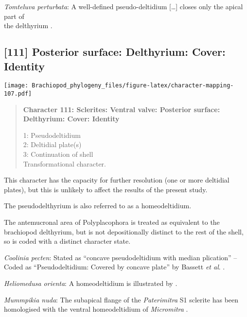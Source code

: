 \documentclass[openany]{book}
\theoremstyle{definition}
\theoremstyle{definition}
\theoremstyle{definition}
\theoremstyle{remark}
\begin{document}
\hypertarget{Tomteluva_perturbata-coding-110}{}
\emph{Tomteluva perturbata}: A well-defined pseudo-deltidium
{[}\ldots{}{]} closes only the apical part of\\
the delthyrium \citep{Rowell1985Theevolutionary}.

\subsection*{{[}111{]} Posterior surface: Delthyrium: Cover:
Identity}\label{posterior-surface-delthyrium-cover-identity}

\texttt{[image: Brachiopod\_phylogeny\_files/figure-latex/character-mapping-107.pdf]}

\begin{quote}
\textbf{Character 111: Sclerites: Ventral valve: Posterior surface:
Delthyrium: Cover: Identity}

1: Pseudodeltidium\\
2: Deltidial plate(s)\\
3: Continuation of shell\\
Transformational character.
\end{quote}

This character has the capacity for further resolution (one or more
deltidial plates), but this is unlikely to affect the results of the
present study.

The pseudodelthyrium is also referred to as a homeodeltidium.

The antemucronal area of Polyplacophora is treated as equivalent to the
brachiopod delthyrium, but is not depositionally distinct to the rest of
the shell, so is coded with a distinct character state.

\hypertarget{Coolinia_pecten-coding-111}{}
\emph{Coolinia pecten}: Stated as ``concave pseudodeltidium with median
plication'' -- \citet{Williams2000LinguliformeaCraniiformea}\\
Coded as ``Pseudodeltidium: Covered by concave plate'' by Bassett
\emph{et al}. \citeyearpar{Bassett2001Functionalmorphology}.

\hypertarget{Heliomedusa_orienta-coding-111}{}
\emph{Heliomedusa orienta}: A homeodeltidium is illustrated by
\citet{Hanken1985Thetaxonomy}.

\hypertarget{Mummpikia_nuda-coding-111}{}
\emph{Mummpikia nuda}: The subapical flange of the \emph{Paterimitra} S1
sclerite has been homologised with the ventral homeodeltidium of
\emph{Micromitra} \citep{Larsson2014iPaterimitra}.
\end{document}
